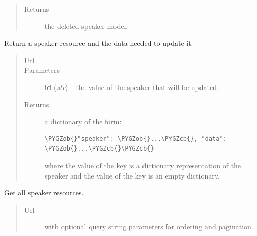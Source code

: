 \documentclass[letterpaper,10pt,english]{sphinxmanual}
\def\PYGZob{\char`\{}
\def\PYGZcb{\char`\}}
\begin{document}
\begin{fulllineitems}
\begin{fulllineitems}
\begin{quote}
\begin{description}
\item[{Returns}] \leavevmode
the deleted speaker model.

\end{description}\end{quote}

\end{fulllineitems}


\begin{fulllineitems}
\label{api:onlinelinguisticdatabase.controllers.speakers.SpeakersController.edit}
Return a speaker resource and the data needed to update it.
\begin{quote}\begin{description}
\item[{Url }] \leavevmode
{}

\item[{Parameters}] \leavevmode
\textbf{id} (\emph{str}) -- the  value of the speaker that will be updated.

\item[{Returns}] \leavevmode

a dictionary of the form:

\begin{Verbatim}[commandchars=\\\{\}]
\PYGZob{}"speaker": \PYGZob{}...\PYGZcb{}, "data": \PYGZob{}...\PYGZcb{}\PYGZcb{}
\end{Verbatim}

where the value of the  key is a dictionary
representation of the speaker and the value of the  key
is an empty dictionary.


\end{description}\end{quote}

\end{fulllineitems}


\begin{fulllineitems}
\label{api:onlinelinguisticdatabase.controllers.speakers.SpeakersController.index}
Get all speaker resources.
\begin{quote}\begin{description}
\item[{Url }] \leavevmode
{} with optional query string parameters for
ordering and pagination.


\end{description}
\end{quote}
\end{fulllineitems}
\end{fulllineitems}
\end{document}
